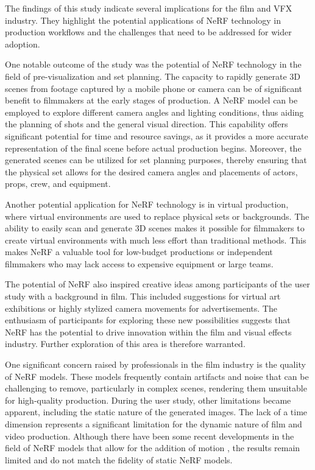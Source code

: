 The findings of this study indicate several implications for the film and VFX industry. 
They highlight the potential applications of NeRF technology in production workflows and the challenges that need to be addressed for wider adoption.

One notable outcome of the study was the potential of NeRF technology in the field of pre-visualization and set planning.
The capacity to rapidly generate 3D scenes from footage captured by a mobile phone or camera can be of significant benefit to filmmakers at the early stages of production.
A NeRF model can be employed to explore different camera angles and lighting conditions, thus aiding the planning of shots and the general visual direction.
This capability offers significant potential for time and resource savings, as it provides a more accurate representation of the final scene before actual production begins.
Moreover, the generated scenes can be utilized for set planning purposes, thereby ensuring that the physical set allows for the desired camera angles and placements of actors, props, crew, and equipment.

Another potential application for NeRF technology is in virtual production, where virtual environments are used to replace physical sets or backgrounds.
The ability to easily scan and generate 3D scenes makes it possible for filmmakers to create virtual environments with much less effort than traditional methods.
This makes NeRF a valuable tool for low-budget productions or independent filmmakers who may lack access to expensive equipment or large teams.

The potential of NeRF also inspired creative ideas among participants of the user study with a background in film.
This included suggestions for virtual art exhibitions or highly stylized camera movements for advertisements.
The enthusiasm of participants for exploring these new possibilities suggests that NeRF has the potential to drive innovation within the film and visual effects industry.
Further exploration of this area is therefore warranted.

One significant concern raised by professionals in the film industry is the quality of NeRF models.
These models frequently contain artifacts and noise that can be challenging to remove, particularly in complex scenes, rendering them unsuitable for high-quality production.
During the user study, other limitations became apparent, including the static nature of the generated images.
The lack of a time dimension represents a significant limitation for the dynamic nature of film and video production.
Although there have been some recent developments in the field of NeRF models that allow for the addition of motion \cite{fridovich-keil_k-planes_2023}, the results remain limited and do not match the fidelity of static NeRF models.

